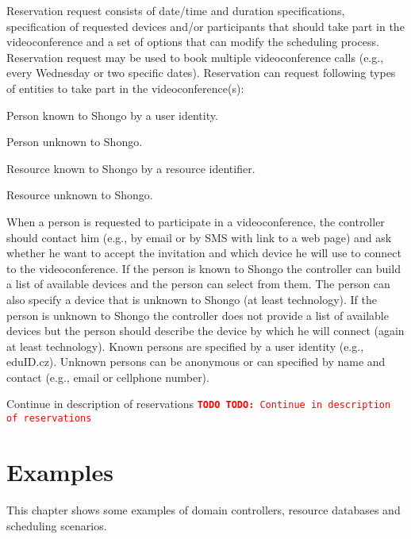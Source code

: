 \documentclass[a4paper]{report}
\newcommand{\TODO}[1]{%
\def\empty{}%
\def\prvniparametr{#1}%
\ifx\prvniparametr\empty%
\begingroup\tt\textcolor{red}{\noindent\textbf{TODO}}\endgroup
\else%
\begingroup\tt\textcolor{red}{\noindent\textbf{TODO:}\ #1}\endgroup
\fi%
}
\begin{document}
Reservation request consists of date/time and duration specifications, specification of requested devices and/or participants that should take part in the videoconference and a set of options that can modify the scheduling process. Reservation request may be used to book multiple videoconference calls (e.g., every Wednesday or two specific dates). Reservation can request following types of entities to take part in the videoconference(s):
\begin{compactenum}
\item Person known to Shongo by a user identity.
\item Person unknown to Shongo.
\item Resource known to Shongo by a resource identifier.
\item Resource unknown to Shongo.
\end{compactenum}
When a person is requested to participate in a videoconference, the controller should contact him (e.g., by email or by SMS with link to a web page) and ask whether he want to accept the invitation and which device he will use to connect to the videoconference. If the person is known to Shongo the controller can build a list of available devices and the person can select from them. The person can also specify a device that is unknown to Shongo (at least technology). If the person is unknown to Shongo the controller does not provide a list of available devices but the person should describe the device by which he will connect (again at least technology). Known persons are specified by a user identity (e.g., eduID.cz). Unknown persons can be anonymous or can specified by name and contact (e.g., email or cellphone number).


\TODO{Continue in description of reservations}




\chapter{Examples}

This chapter shows some examples of domain controllers, resource databases and scheduling scenarios.



\end{document}
